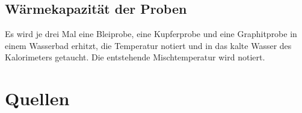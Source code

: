\documentclass[12pt,a4paper]{article}
\begin{document}
\subsection{Wärmekapazität der Proben}
Es wird je drei Mal eine Bleiprobe, eine Kupferprobe und eine Graphitprobe in einem Wasserbad erhitzt, die Temperatur notiert und in das kalte Wasser des Kalorimeters getaucht. Die entstehende Mischtemperatur wird notiert.
\newpage
\section{Quellen}
\end{document}
